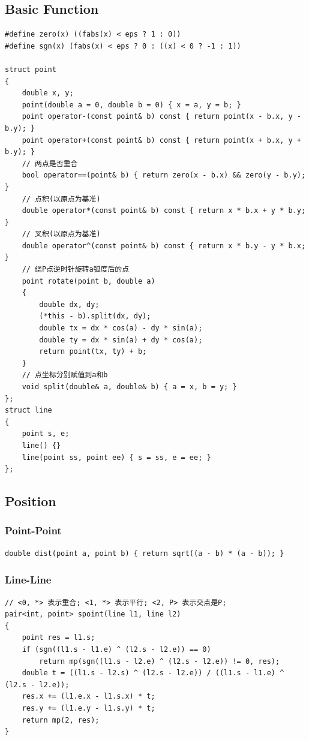 \documentclass[twoside]{article}
\begin{document}
\subsection{Basic Function}
\begin{lstlisting}
#define zero(x) ((fabs(x) < eps ? 1 : 0))
#define sgn(x) (fabs(x) < eps ? 0 : ((x) < 0 ? -1 : 1))

struct point
{
    double x, y;
    point(double a = 0, double b = 0) { x = a, y = b; }
    point operator-(const point& b) const { return point(x - b.x, y - b.y); }
    point operator+(const point& b) const { return point(x + b.x, y + b.y); }
    // 两点是否重合
    bool operator==(point& b) { return zero(x - b.x) && zero(y - b.y); }
    // 点积(以原点为基准)
    double operator*(const point& b) const { return x * b.x + y * b.y; }
    // 叉积(以原点为基准)
    double operator^(const point& b) const { return x * b.y - y * b.x; }
    // 绕P点逆时针旋转a弧度后的点
    point rotate(point b, double a)
    {
        double dx, dy;
        (*this - b).split(dx, dy);
        double tx = dx * cos(a) - dy * sin(a);
        double ty = dx * sin(a) + dy * cos(a);
        return point(tx, ty) + b;
    }
    // 点坐标分别赋值到a和b
    void split(double& a, double& b) { a = x, b = y; }
};
struct line
{
    point s, e;
    line() {}
    line(point ss, point ee) { s = ss, e = ee; }
};
\end{lstlisting}
\subsection{Position}
\subsubsection{Point-Point}
\begin{lstlisting}
double dist(point a, point b) { return sqrt((a - b) * (a - b)); }
\end{lstlisting}
\subsubsection{Line-Line}
\begin{lstlisting}
// <0, *> 表示重合; <1, *> 表示平行; <2, P> 表示交点是P;
pair<int, point> spoint(line l1, line l2)
{
    point res = l1.s;
    if (sgn((l1.s - l1.e) ^ (l2.s - l2.e)) == 0)
        return mp(sgn((l1.s - l2.e) ^ (l2.s - l2.e)) != 0, res);
    double t = ((l1.s - l2.s) ^ (l2.s - l2.e)) / ((l1.s - l1.e) ^ (l2.s - l2.e));
    res.x += (l1.e.x - l1.s.x) * t;
    res.y += (l1.e.y - l1.s.y) * t;
    return mp(2, res);
}
\end{lstlisting}
\end{document}
